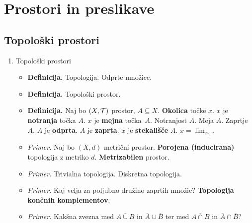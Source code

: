 \section{Prostori in preslikave}

\subsection{Topološki prostori}
\begin{enumerate}
    \item Topološki prostori
    \begin{itemize}
        \item \colorbox{purple!30}{\textbf{Definicija.}} Topologija. Odprte množice.
        \item \colorbox{purple!30}{\textbf{Definicija.}} Topološki prostor.
        \item \colorbox{purple!30}{\textbf{Definicija.}} Naj bo $(X, \mathcal{T})$ prostor, $A \subseteq X$. \textbf{Okolica} točke $x$. $x$ je \textbf{notranja} točka $A$. $x$ je \textbf{mejna} točka~$A$. Notranjost $A$. Meja $A$. Zaprtje $A$. $A$ je \textbf{odprta}. $A$ je \textbf{zaprta}. $x$ je \textbf{stekališče} $A$. $x = \lim_{x_n}$.
        \item \colorbox{yellow!30}{\emph{Primer.}} Naj bo $(X, d)$ metrični prostor. \textbf{Porojena (inducirana)} topologija z metriko $d$. \textbf{Metrizabilen} prostor.
        \item \colorbox{yellow!30}{\emph{Primer.}} Trivialna topologija. Diskretna topologija.
        \item \colorbox{yellow!30}{\emph{Primer.}} Kaj velja za poljubno družino zaprtih množic? \textbf{Topologija končnih komplementov}.
        \item \colorbox{yellow!30}{\emph{Primer.}} Kakšna zvezna med $\overline{A \cup B}$ in $\overline{A} \cup \overline{B}$ ter med $\overline{A \cap B}$ in $\overline{A} \cap \overline{B}$?
    \end{itemize}
\end{enumerate}
